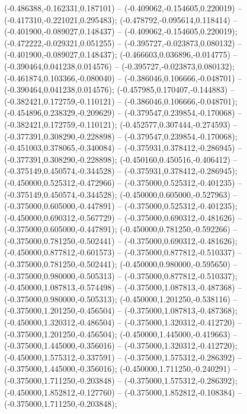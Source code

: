  (-0.486388,-0.162331,0.187101) -- (-0.409062,-0.154605,0.220019) -- (-0.417310,-0.221021,0.295483);
 (-0.478792,-0.095614,0.118414) -- (-0.401900,-0.089027,0.148437) -- (-0.409062,-0.154605,0.220019);
 (-0.472222,-0.029321,0.051255) -- (-0.395727,-0.023873,0.080132) -- (-0.401900,-0.089027,0.148437);
 (-0.466603,0.036896,-0.014775) -- (-0.390464,0.041238,0.014576) -- (-0.395727,-0.023873,0.080132);
 (-0.461874,0.103366,-0.080040) -- (-0.386046,0.106666,-0.048701) -- (-0.390464,0.041238,0.014576);
 (-0.457985,0.170407,-0.144883) -- (-0.382421,0.172759,-0.110121) -- (-0.386046,0.106666,-0.048701);
 (-0.454896,0.238329,-0.209629) -- (-0.379547,0.239854,-0.170068) -- (-0.382421,0.172759,-0.110121);
 (-0.452577,0.307444,-0.274593) -- (-0.377391,0.308290,-0.228898) -- (-0.379547,0.239854,-0.170068);
 (-0.451003,0.378065,-0.340084) -- (-0.375931,0.378412,-0.286945) -- (-0.377391,0.308290,-0.228898);
 (-0.450160,0.450516,-0.406412) -- (-0.375149,0.450574,-0.344528) -- (-0.375931,0.378412,-0.286945);
 (-0.450000,0.525312,-0.472966) -- (-0.375000,0.525312,-0.401235) -- (-0.375149,0.450574,-0.344528);
 (-0.450000,0.605000,-0.527963) -- (-0.375000,0.605000,-0.447891) -- (-0.375000,0.525312,-0.401235);
 (-0.450000,0.690312,-0.567729) -- (-0.375000,0.690312,-0.481626) -- (-0.375000,0.605000,-0.447891);
 (-0.450000,0.781250,-0.592266) -- (-0.375000,0.781250,-0.502441) -- (-0.375000,0.690312,-0.481626);
 (-0.450000,0.877812,-0.601573) -- (-0.375000,0.877812,-0.510337) -- (-0.375000,0.781250,-0.502441);
 (-0.450000,0.980000,-0.595650) -- (-0.375000,0.980000,-0.505313) -- (-0.375000,0.877812,-0.510337);
 (-0.450000,1.087813,-0.574498) -- (-0.375000,1.087813,-0.487368) -- (-0.375000,0.980000,-0.505313);
 (-0.450000,1.201250,-0.538116) -- (-0.375000,1.201250,-0.456504) -- (-0.375000,1.087813,-0.487368);
 (-0.450000,1.320312,-0.486504) -- (-0.375000,1.320312,-0.412720) -- (-0.375000,1.201250,-0.456504);
 (-0.450000,1.445000,-0.419663) -- (-0.375000,1.445000,-0.356016) -- (-0.375000,1.320312,-0.412720);
 (-0.450000,1.575312,-0.337591) -- (-0.375000,1.575312,-0.286392) -- (-0.375000,1.445000,-0.356016);
 (-0.450000,1.711250,-0.240291) -- (-0.375000,1.711250,-0.203848) -- (-0.375000,1.575312,-0.286392);
 (-0.450000,1.852812,-0.127760) -- (-0.375000,1.852812,-0.108384) -- (-0.375000,1.711250,-0.203848);
